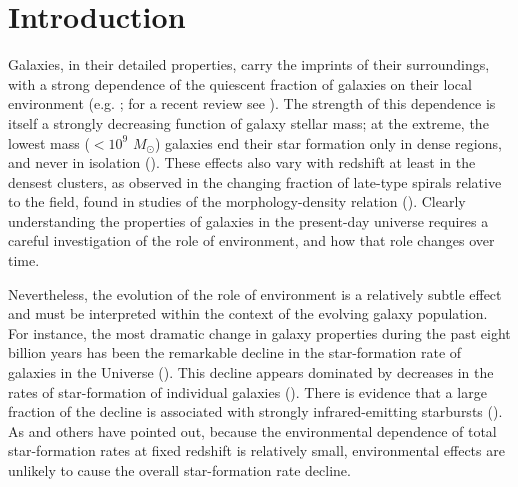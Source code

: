 \documentclass{emulateapj}
\begin{document}
\section{Introduction}
Galaxies, in their detailed properties, carry the imprints of their surroundings, with a strong dependence of the quiescent fraction of galaxies on their local environment (e.g. \citealt{hubble36a, oemler74a, dressler80a, hermit96a, guzzo97a}; for a recent review see \citealt{blanton09a}).  The strength of this dependence is itself a strongly decreasing function of galaxy stellar mass; at the extreme, the lowest mass ($<10^{9}$ $M_\odot$) galaxies end their star formation only in dense regions, and never in isolation (\citealt{geha12a}). These effects also vary with redshift at least in the densest clusters, as observed in the changing fraction of late-type spirals relative to the field, found in studies of the morphology-density relation (\citealt{dressler84a, Fasano:2000aa, Smith:2005aa, desai07a}). Clearly understanding the properties of galaxies in the present-day universe requires a careful investigation of the role of environment, and how that role changes over time.


Nevertheless, the evolution of the role of environment is a relatively subtle effect and must be interpreted within the context of the evolving galaxy population. For instance, the most dramatic change in galaxy properties during the past eight billion years has been the remarkable decline in the star-formation rate of galaxies in the Universe (\citealt{hopkins06a}). This decline appears dominated by decreases in the rates of star-formation of individual galaxies (\citealt{Noeske:2007aa}). There is evidence that a large fraction of the decline is associated with strongly infrared-emitting starbursts (\citealt{bell05a, magnelli09a}). As \cite{cooper08a} and others have pointed out, because the environmental dependence of total star-formation rates at fixed redshift is relatively small, environmental effects are unlikely to cause the overall star-formation rate decline.
\end{document}
